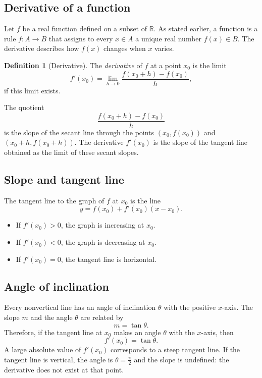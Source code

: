 \documentclass[11pt,a4paper]{article}
\theoremstyle{definition} \newtheorem{definition}{Definition} \theoremstyle{plain} \newtheorem{theorem}{Theorem}
\begin{document}
\subsection{Derivative of a function}
Let $f$ be a real function defined on a subset of $\mathbb{R}$.
As stated earlier, a function is a rule $f:A\to B$ that assigns to every $x\in A$ a unique real number $f(x)\in B$.
The derivative describes how $f(x)$ changes when $x$ varies.
\begin{definition}[Derivative] The \emph{derivative} of $f$ at a point $x_0$ is the limit
\[\boxed{ f'(x_0) = \lim_{h\to 0} \frac{f(x_0+h)-f(x_0)}{h}, }\]
if this limit exists. \end{definition}
The quotient
\[ \frac{f(x_0+h)-f(x_0)}{h} \]
is the slope of the secant line through the points $(x_0,f(x_0))$ and $(x_0+h,f(x_0+h))$.
The derivative $f'(x_0)$ is the slope of the tangent line obtained as the limit of these secant slopes.
\subsection{Slope and tangent line}
The tangent line to the graph of $f$ at $x_0$ is the line
\[ y = f(x_0) + f'(x_0)(x - x_0). \]
\begin{itemize}
\item If $f'(x_0)>0$, the graph is increasing at $x_0$.
\item If $f'(x_0)<0$, the graph is decreasing at $x_0$.
\item If $f'(x_0)=0$, the tangent line is horizontal. \end{itemize}
\subsection*{Angle of inclination}
Every nonvertical line has an angle of inclination $\theta$ with the positive $x$-axis.
The slope $m$ and the angle $\theta$ are related by
\[ m = \tan\theta. \]
Therefore, if the tangent line at $x_0$ makes an angle $\theta$ with the $x$-axis, then
\[ f'(x_0) = \tan\theta. \]
A large absolute value of $f'(x_0)$ corresponds to a steep tangent line.
If the tangent line is vertical, the angle is $\theta=\frac{\pi}{2}$ and the slope is undefined: the derivative does not exist at that point.
\end{document}
